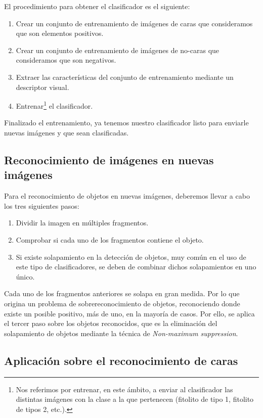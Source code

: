 El procedimiento para obtener el clasificador es el siguiente:

\begin{enumerate}[1.]
  \item Crear un conjunto de entrenamiento de imágenes de caras que consideramos que son elementos positivos.
  \item Crear un conjunto de entrenamiento de imágenes de no-caras que consideramos que son negativos.
  \item Extraer las características del conjunto de entrenamiento  mediante un descriptor visual.
  \item Entrenar\footnote{Nos referimos por entrenar, en este ámbito, a enviar al clasificador las distintas imágenes con la clase a la que pertenecen (fitolito de tipo 1, fitolito de tipos 2, etc.).} el clasificador.
\end{enumerate}

 Finalizado el entrenamiento, ya tenemos nuestro clasificador listo para enviarle nuevas imágenes y que sean clasificadas.
 
\subsection{Reconocimiento de imágenes en nuevas imágenes}
Para el reconocimiento de objetos en nuevas imágenes, deberemos llevar a cabo los tres siguientes pasos:

\begin{enumerate}[1.]
  \item Dividir la imagen en múltiples fragmentos.
  \item Comprobar si cada uno de los fragmentos contiene el objeto.
  \item Si existe solapamiento en la detección de objetos, muy común en el uso de este tipo de clasificadores, se deben de combinar dichos solapamientos en uno único.
\end{enumerate}

Cada uno de los fragmentos anteriores se solapa en gran medida. Por lo que origina un problema de sobrereconocimiento de objetos, reconociendo donde existe un posible positivo, más de uno, en la mayoría de casos. Por ello, se aplica el tercer paso sobre los objetos reconocidos, que es la eliminación del solapamiento de objetos mediante la técnica de \textit{Non-maximum suppression}.

\subsection{Aplicación sobre el reconocimiento de caras}

